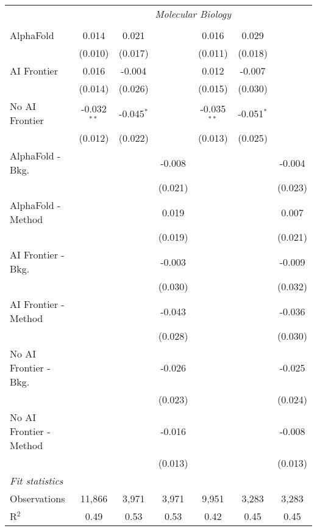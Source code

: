 \begin{tabular}{lcccccc}
 & \multicolumn{6}{c}{\textit{Molecular Biology}} \\ \\
   AlphaFold               & 0.014         & 0.021        &         & 0.016         & 0.029        &   \\   
                           & (0.010)       & (0.017)      &         & (0.011)       & (0.018)      &   \\   
   AI Frontier             & 0.016         & -0.004       &         & 0.012         & -0.007       &   \\   
                           & (0.014)       & (0.026)      &         & (0.015)       & (0.030)      &   \\   
   No AI Frontier          & -0.032$^{**}$ & -0.045$^{*}$ &         & -0.035$^{**}$ & -0.051$^{*}$ &   \\   
                           & (0.012)       & (0.022)      &         & (0.013)       & (0.025)      &   \\   
   AlphaFold - Bkg.        &               &              & -0.008  &               &              & -0.004\\   
                           &               &              & (0.021) &               &              & (0.023)\\   
   AlphaFold - Method      &               &              & 0.019   &               &              & 0.007\\   
                           &               &              & (0.019) &               &              & (0.021)\\   
   AI Frontier - Bkg.      &               &              & -0.003  &               &              & -0.009\\   
                           &               &              & (0.030) &               &              & (0.032)\\   
   AI Frontier - Method    &               &              & -0.043  &               &              & -0.036\\   
                           &               &              & (0.028) &               &              & (0.030)\\   
   No AI Frontier - Bkg.   &               &              & -0.026  &               &              & -0.025\\   
                           &               &              & (0.023) &               &              & (0.024)\\   
   No AI Frontier - Method &               &              & -0.016  &               &              & -0.008\\   
                           &               &              & (0.013) &               &              & (0.013)\\   
   \midrule
   \emph{Fit statistics}\\
   Observations            & 11,866        & 3,971        & 3,971   & 9,951         & 3,283        & 3,283\\  
   R$^2$                   & 0.49          & 0.53         & 0.53    & 0.42          & 0.45         & 0.45\\  
   

\end{tabular}
